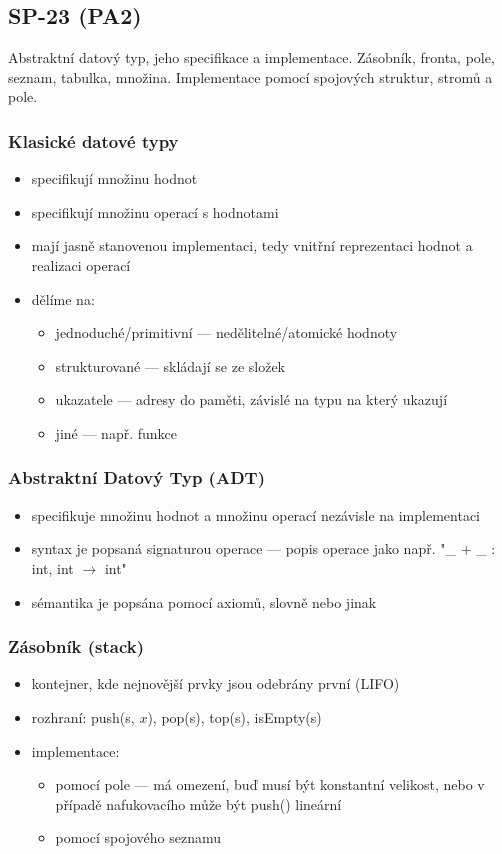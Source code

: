 \subsection{SP-23 (PA2)}
Abstraktní datový typ, jeho specifikace a implementace. Zásobník, fronta, pole, seznam, tabulka, množina. Implementace pomocí spojových struktur, stromů a pole.

\subsubsection*{Klasické datové typy}
\begin{itemize}
	\item specifikují množinu hodnot
	\item specifikují množinu operací s hodnotami
	\item mají jasně stanovenou implementaci, tedy vnitřní reprezentaci hodnot a realizaci operací
	\item dělíme na:
	\begin{itemize}
		\item jednoduché/primitivní --- nedělitelné/atomické hodnoty
		\item strukturované --- skládají se ze složek
		\item ukazatele --- adresy do paměti, závislé na typu na který ukazují
		\item jiné --- např. funkce
	\end{itemize}
\end{itemize}

\subsubsection*{Abstraktní Datový Typ (ADT)}
\begin{itemize}
	\item specifikuje množinu hodnot a množinu operací nezávisle na implementaci
	\item syntax je popsaná signaturou operace --- popis operace jako např. "\_ + \_ : int, int $\rightarrow$ int"
	\item sémantika je popsána pomocí axiomů, slovně nebo jinak
\end{itemize}

\subsubsection*{Zásobník (stack)}
\begin{itemize}
	\item kontejner, kde nejnovější prvky jsou odebrány první (LIFO)
	\item rozhraní: push(s, $x$), pop(s), top(s), isEmpty(s)
	\item implementace:
	\begin{itemize}
		\item pomocí pole --- má omezení, buď musí být konstantní velikost, nebo v případě nafukovacího může být push() lineární
		\item pomocí spojového seznamu
	\end{itemize}
\end{itemize}

